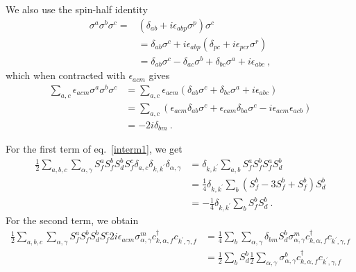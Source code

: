 \documentclass[%
reprint,
superscriptaddress,
groupedaddress,
superscriptaddress,
onecolumn,
10pt
]{revtex4-2}
\begin{document}
We also use the spin-half identity
\begin{equation}\begin{aligned}\label{identity1}
	\sigma^a \sigma^b \sigma^c =& (\delta_{ab} + i\epsilon_{abp}\sigma^p)\sigma^c\\
									  &=\delta_{ab}\sigma^c + i\epsilon_{abp}(\delta_{pc} + i\epsilon_{pcr}\sigma^r)\\
									  &=\delta_{ab}\sigma^c - \delta_{ac}\sigma^b + \delta_{bc} \sigma^a + i\epsilon_{abc}~,
\end{aligned}\end{equation}
which when contracted with \(\epsilon_{acm}\) gives
\begin{equation}\begin{aligned}
	\sum_{a,c}\epsilon_{acm}\sigma^a \sigma^b \sigma^c &= \sum_{a,c}\epsilon_{acm}(\delta_{ab}\sigma^c + \delta_{bc} \sigma^a + i\epsilon_{abc}) \\
													   &= \sum_{a,c}(\epsilon_{acm}\delta_{ab}\sigma^c + \epsilon_{cam}\delta_{ba} \sigma^c - i\epsilon_{acm}\epsilon_{acb})\\
													   &= - 2i\delta_{bm}~.
\end{aligned}\end{equation}

For the first term of eq.~\ref{interm1}, we get
\begin{equation}\begin{aligned}
	\frac{1}{2}\sum_{a,b,c} \sum_{\alpha,\gamma} S_f^a S_f^b S_d^b S_f^c \delta_{a,c}\delta_{k,k^\prime}\delta_{\alpha,\gamma} &= \delta_{k,k^\prime}\sum_{a,b}S_f^a S_f^b S_f^a S_d^b\\
																															   &= \frac{1}{4} \delta_{k,k^\prime}\sum_{b}(S_f^b - 3 S_f^b + S_f^b) S_d^b\\
																															   &= -\frac{1}{4} \delta_{k,k^\prime}\sum_{b}S_f^b S_d^b~.
\end{aligned}\end{equation}
For the second term, we obtain
\begin{equation}\begin{aligned}
	\frac{1}{2}\sum_{a,b,c} \sum_{\alpha,\gamma} S_f^a S_f^b S_d^b S_f^c 2i \epsilon_{acm} \sigma^m_{\alpha,\gamma}c^\dagger_{k,\alpha,f} c_{k^\prime,\gamma,f} &= \frac{1}{4}\sum_{b} \sum_{\alpha,\gamma}\delta_{bm} S_d^b \sigma^m_{\alpha,\gamma}c^\dagger_{k,\alpha,f} c_{k^\prime,\gamma,f}\\
																																								&= \frac{1}{2}\sum_{b} S_d^b \frac{1}{2}\sum_{\alpha,\gamma}\sigma^b_{\alpha,\gamma}c^\dagger_{k,\alpha,f} c_{k^\prime,\gamma,f}
\end{aligned}\end{equation}
\end{document}
